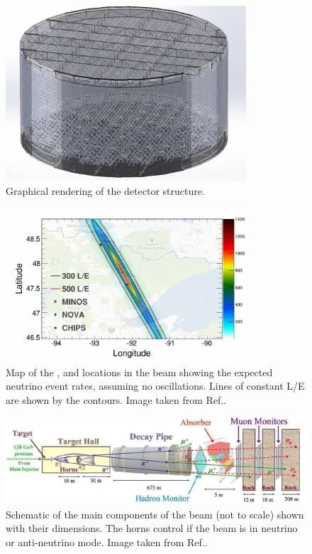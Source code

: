 \begin{figure}
    \includegraphics[width=0.8\textwidth]{diagrams/4-chips/chips_render_2.png}
    \caption[Graphical rendering of the \chipsfive detector structure.]
    {Graphical rendering of the \chipsfive detector structure.}
    \label{fig:chips_render_2}
\end{figure}

\begin{figure}
    \includegraphics[width=0.8\textwidth]{diagrams/4-chips/numi_map.png}
    \caption[Map of detector locations in the \numi beam.]
    {Map of the \chips, \nova and \minos locations in the \numi beam showing the expected
        neutrino event rates, assuming no oscillations. Lines of constant L/E are shown by the contours.
        Image taken from Ref.\cite{adamson2013}.}
    \label{fig:numi_map}
\end{figure}

\begin{figure}
    \includegraphics[width=\textwidth]{diagrams/4-chips/numi_beam.png}
    \caption[Schematic of the \numi beam.]
    {Schematic of the main components of the \numi beam (not to scale) shown with their dimensions.
        The horns control if the beam is in neutrino or anti-neutrino mode. Image taken from Ref.\cite{adamson2016}.}
    \label{fig:numi_beam}
\end{figure}

